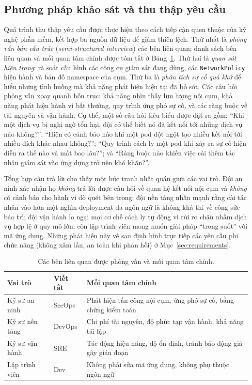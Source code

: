\subsection{Phương pháp khảo sát và thu thập yêu cầu}
\label{subsec:survey-method}

Quá trình thu thập yêu cầu được thực hiện theo cách tiếp cận quen thuộc của kỹ nghệ phần
mềm, kết hợp ba nguồn dữ liệu để giảm thiên lệch. Thứ nhất là \emph{phỏng vấn bán cấu
trúc} (\textit{semi-structured interview}) các bên liên quan; danh sách bên liên quan và
mối quan tâm chính được tóm tắt ở Bảng~\ref{tab:stakeholders}. Thứ hai là \emph{quan sát
hiện trạng}: rà soát cấu hình các công cụ giám sát đang dùng, các \texttt{NetworkPolicy}
hiện hành và bản đồ namespace của cụm. Thứ ba là \emph{phân tích sự cố quá khứ} để hiểu
những tình huống mà khả năng phát hiện hiện tại đã bỏ sót. Các câu hỏi phỏng vấn xoay
quanh bốn trục: khả năng nhìn thấy lưu lượng nội cụm, khả năng phát hiện hành vi bất
thường, quy trình ứng phó sự cố, và các ràng buộc về tài nguyên và vận hành. Cụ thể, một
số câu hỏi tiêu biểu được đặt ra gồm: ``Khi một dịch vụ bị nghi ngờ tổn hại, đội có thể
biết nó đã kết nối tới những dịch vụ nào không?''; ``Hiện có cảnh báo nào khi một pod đột
ngột tạo nhiều kết nối tới nhiều đích khác nhau không?''; ``Quy trình cách ly một pod khi
xảy ra sự cố hiện diễn ra thế nào và mất bao lâu?''; và ``Ràng buộc nào khiến việc cài
thêm tác nhân giám sát vào ứng dụng trở nên khó khăn?''.

Tổng hợp câu trả lời cho thấy một bức tranh nhất quán giữa các vai trò. Đội an ninh xác
nhận họ \emph{không} trả lời được câu hỏi về quan hệ kết nối nội cụm và \emph{không} có
cảnh báo cho hành vi dò quét bên trong; đội nền tảng nhấn mạnh rằng cài tác nhân vào hơn
một nghìn deployment đa ngôn ngữ là không khả thi về công sức bảo trì; đội vận hành lo ngại
mọi cơ chế cách ly tự động vì rủi ro chặn nhầm dịch vụ hợp lệ ở quy mô lớn; còn lập trình
viên mong muốn giải pháp ``trong suốt'' với mã ứng dụng. Những phát hiện này về sau định
hình trực tiếp các yêu cầu phi chức năng (không xâm lấn, an toàn khi phản hồi) ở
Mục~\ref{sec:requirements}.

\begin{table}[H]
  \centering
  \caption{Các bên liên quan được phỏng vấn và mối quan tâm chính.}
  \label{tab:stakeholders}
  \small
  \begin{tabularx}{\linewidth}{@{}l l X@{}}
    \toprule
    \textbf{Vai trò} & \textbf{Viết tắt} & \textbf{Mối quan tâm chính} \\
    \midrule
    Kỹ sư an ninh        & SecOps   & Phát hiện tấn công nội cụm, ứng phó sự cố, bằng chứng kiểm toán \\
    Kỹ sư nền tảng       & DevOps   & Chi phí tài nguyên, độ phức tạp vận hành, khả năng tái lập \\
    Kỹ sư vận hành       & SRE      & Tác động hiệu năng, độ ổn định, tránh báo động giả gây gián đoạn \\
    Lập trình viên       & Dev      & Không phải sửa mã ứng dụng, không phụ thuộc ngôn ngữ \\
    \bottomrule
  \end{tabularx}
\end{table}

